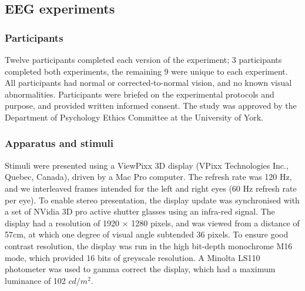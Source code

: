 \documentclass[]{article}
\begin{document}
\hypertarget{eeg-experiments}{%
\subsection{EEG experiments}\label{eeg-experiments}}

\hypertarget{participants}{%
\subsubsection{Participants}\label{participants}}

Twelve participants completed each version of the experiment; 3 participants completed both experiments, the remaining 9 were unique to each experiment. All participants had normal or corrected-to-normal vision, and no known visual abnormalities. Participants were briefed on the experimental protocols and purpose, and provided written informed consent. The study was approved by the Department of Psychology Ethics Committee at the University of York.

\hypertarget{apparatus-and-stimuli}{%
\subsubsection{Apparatus and stimuli}\label{apparatus-and-stimuli}}

Stimuli were presented using a ViewPixx 3D display (VPixx Technologies Inc., Quebec, Canada), driven by a Mac Pro computer. The refresh rate was 120 Hz, and we interleaved frames intended for the left and right eyes (60 Hz refresh rate per eye). To enable stereo presentation, the display update was synchronised with a set of NVidia 3D pro active shutter glasses using an infra-red signal. The display had a resolution of 1920 \(\times\) 1280 pixels, and was viewed from a distance of 57cm, at which one degree of visual angle subtended 36 pixels. To ensure good contrast resolution, the display was run in the high bit-depth monochrome M16 mode, which provided 16 bits of greyscale resolution. A Minolta LS110 photometer was used to gamma correct the display, which had a maximum luminance of 102 \(cd/m^2\).
\end{document}
